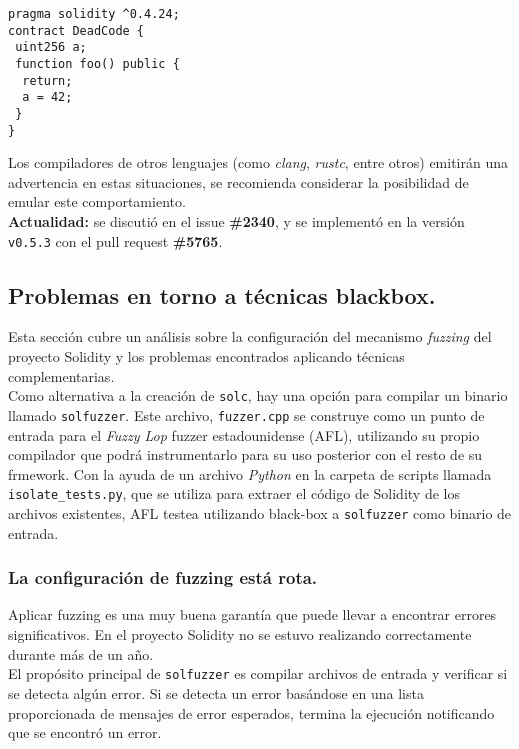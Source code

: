 \begin{lstlisting}[language=Solidity] 
pragma solidity ^0.4.24;
contract DeadCode {
 uint256 a;
 function foo() public {
  return;
  a = 42;
 }
}
\end{lstlisting}

Los compiladores de otros lenguajes (como \textit{clang}, \textit{rustc}, entre otros) emitirán una advertencia en estas situaciones, se recomienda considerar la posibilidad de emular este comportamiento.\\

\textbf{Actualidad:} se discutió en el issue \textbf{\#2340}\cite{GHI2340}, y se implementó en la versión \texttt{v0.5.3} con el pull request \textbf{\#5765}\cite{GHPR5765}.\\

\subsection{Problemas en torno a técnicas blackbox.}

Esta sección cubre un análisis sobre la configuración del mecanismo \textit{fuzzing} del proyecto Solidity y los problemas encontrados aplicando técnicas complementarias.\\

Como alternativa a la creación de \texttt{solc}, hay una opción para compilar un binario llamado \texttt{solfuzzer}. Este archivo, \texttt{fuzzer.cpp} se construye como un punto de entrada para el \textit{Fuzzy Lop} fuzzer estadounidense (AFL), utilizando su propio compilador que podrá instrumentarlo para su uso posterior con el resto de su frmework. Con la ayuda de un archivo \textit{Python} en la carpeta de scripts llamada \texttt{isolate\_tests.py}\cite{GHisolatetests}, que se utiliza para extraer el código de Solidity de los archivos existentes, AFL testea utilizando black-box a \texttt{solfuzzer} como binario de entrada.\\


\subsubsection{La configuración de fuzzing está rota.}

Aplicar fuzzing es una muy buena garantía que puede llevar a encontrar errores significativos. En el proyecto Solidity no se estuvo realizando correctamente durante más de un año.\\

El propósito principal de \texttt{solfuzzer} es compilar archivos de entrada y verificar si se detecta algún error. Si se detecta un error basándose en una lista proporcionada de mensajes de error esperados, termina la ejecución notificando que se encontró un error.\\

